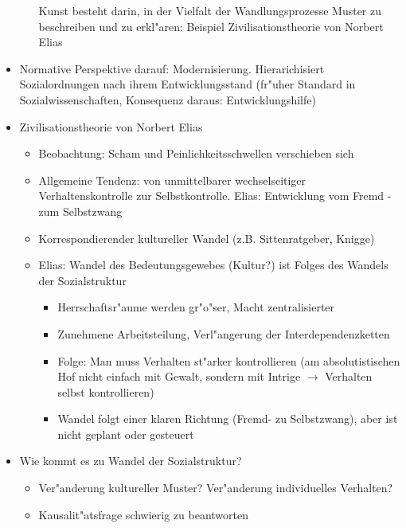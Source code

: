 \begin{itemize}
\begin{itemize}
				Kunst besteht darin, in der Vielfalt der Wandlungsprozesse  Muster zu beschreiben und zu erkl"aren: Beispiel Zivilisationstheorie von Norbert Elias
		\end{itemize}
	\item
		Normative Perspektive darauf: Modernisierung. Hierarichisiert Sozialordnungen nach ihrem Entwicklungsstand (fr"uher Standard in Sozialwissenschaften, Konsequenz daraus: Entwicklungshilfe)
	\item
		Zivilisationstheorie von Norbert Elias
		\begin{itemize}
			\item
				Beobachtung: Scham und Peinlichkeitsschwellen verschieben sich
			\item
				Allgemeine Tendenz: von unmittelbarer wechselseitiger Verhaltenskontrolle zur Selbstkontrolle. Elias: Entwicklung vom Fremd - zum Selbstzwang
			\item
				Korrespondierender kultureller Wandel (z.B. Sittenratgeber, Knigge)
			\item
				Elias: Wandel des Bedeutungsgewebes (Kultur?) ist Folges des Wandels der Sozialstruktur
				\begin{itemize}
					\item
						Herrschaftsr"aume werden gr"o"ser, Macht zentralisierter
					\item
						Zunehmene Arbeitsteilung, Verl"angerung der Interdependenzketten
					\item
						Folge: Man muss Verhalten st"arker kontrollieren (am absolutistischen Hof nicht einfach mit Gewalt, sondern mit Intrige $\rightarrow$ Verhalten selbst kontrollieren)
					\item
						Wandel folgt einer klaren Richtung (Fremd- zu Selbstzwang), aber ist nicht geplant oder gesteuert
				\end{itemize}
		\end{itemize}
	\item
		Wie kommt es zu Wandel der Sozialstruktur?
		\begin{itemize}
			\item
				Ver"anderung kultureller Muster? Ver"anderung individuelles Verhalten?
			\item
				Kausalit"atsfrage schwierig zu beantworten
		\end{itemize}
\end{itemize}
